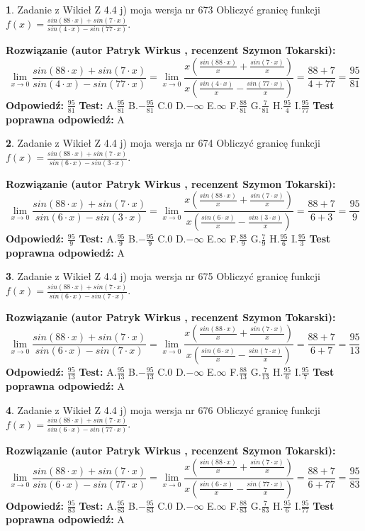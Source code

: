 \documentclass[12pt, a4paper]{article}
\theoremstyle{definition} %
\newtheorem{zad}{}
\newcommand{\zadStart}[1]{\begin{zad}#1\newline}
\newcommand{\zadStop}{\end{zad}}
\newcommand{\rozwStart}[2]{\noindent \textbf{Rozwiązanie (autor #1 , recenzent #2): }\newline}
\newcommand{\rozwStop}{\newline}
\newcommand{\odpStart}{\noindent \textbf{Odpowiedź:}\newline}
\newcommand{\odpStop}{\newline}
\newcommand{\testStart}{\noindent \textbf{Test:}\newline}
\newcommand{\testStop}{\newline}
\newcommand{\kluczStart}{\noindent \textbf{Test poprawna odpowiedź:}\newline}
\newcommand{\kluczStop}{\newline}
\begin{document}
\zadStart{Zadanie z Wikieł Z 4.4 j) moja wersja nr 673}
Obliczyć granicę funkcji $f(x)=\frac{sin(88\cdot x) +sin(7\cdot x)}{sin(4\cdot x) -sin(77\cdot x)}$.
\zadStop
\rozwStart{Patryk Wirkus}{Szymon Tokarski}
$$\lim\limits_{x\to 0}\frac{sin(88\cdot x) +sin(7\cdot x)}{sin(4\cdot x) -sin(77\cdot x)}=\lim\limits_{x\to 0}\frac{x(\frac{sin(88\cdot x)}{x}+\frac{sin(7\cdot x)}{x})}{x(\frac{sin(4\cdot x)}{x}-\frac{sin(77\cdot x)}{x})}=\frac{88+7}{4+77} = \frac{95}{81}$$
\rozwStop
\odpStart
$\frac{95}{81}$
\odpStop
\testStart
A.$\frac{95}{81}$
B.$-\frac{95}{81}$
C.$0$
D.$-\infty$
E.$\infty$
F.$\frac{88}{81}$
G.$\frac{7}{81}$
H.$\frac{95}{4}$
I.$\frac{95}{77}$
\testStop
\kluczStart
A
\kluczStop



\zadStart{Zadanie z Wikieł Z 4.4 j) moja wersja nr 674}
Obliczyć granicę funkcji $f(x)=\frac{sin(88\cdot x) +sin(7\cdot x)}{sin(6\cdot x) -sin(3\cdot x)}$.
\zadStop
\rozwStart{Patryk Wirkus}{Szymon Tokarski}
$$\lim\limits_{x\to 0}\frac{sin(88\cdot x) +sin(7\cdot x)}{sin(6\cdot x) -sin(3\cdot x)}=\lim\limits_{x\to 0}\frac{x(\frac{sin(88\cdot x)}{x}+\frac{sin(7\cdot x)}{x})}{x(\frac{sin(6\cdot x)}{x}-\frac{sin(3\cdot x)}{x})}=\frac{88+7}{6+3} = \frac{95}{9}$$
\rozwStop
\odpStart
$\frac{95}{9}$
\odpStop
\testStart
A.$\frac{95}{9}$
B.$-\frac{95}{9}$
C.$0$
D.$-\infty$
E.$\infty$
F.$\frac{88}{9}$
G.$\frac{7}{9}$
H.$\frac{95}{6}$
I.$\frac{95}{3}$
\testStop
\kluczStart
A
\kluczStop



\zadStart{Zadanie z Wikieł Z 4.4 j) moja wersja nr 675}
Obliczyć granicę funkcji $f(x)=\frac{sin(88\cdot x) +sin(7\cdot x)}{sin(6\cdot x) -sin(7\cdot x)}$.
\zadStop
\rozwStart{Patryk Wirkus}{Szymon Tokarski}
$$\lim\limits_{x\to 0}\frac{sin(88\cdot x) +sin(7\cdot x)}{sin(6\cdot x) -sin(7\cdot x)}=\lim\limits_{x\to 0}\frac{x(\frac{sin(88\cdot x)}{x}+\frac{sin(7\cdot x)}{x})}{x(\frac{sin(6\cdot x)}{x}-\frac{sin(7\cdot x)}{x})}=\frac{88+7}{6+7} = \frac{95}{13}$$
\rozwStop
\odpStart
$\frac{95}{13}$
\odpStop
\testStart
A.$\frac{95}{13}$
B.$-\frac{95}{13}$
C.$0$
D.$-\infty$
E.$\infty$
F.$\frac{88}{13}$
G.$\frac{7}{13}$
H.$\frac{95}{6}$
I.$\frac{95}{7}$
\testStop
\kluczStart
A
\kluczStop



\zadStart{Zadanie z Wikieł Z 4.4 j) moja wersja nr 676}
Obliczyć granicę funkcji $f(x)=\frac{sin(88\cdot x) +sin(7\cdot x)}{sin(6\cdot x) -sin(77\cdot x)}$.
\zadStop
\rozwStart{Patryk Wirkus}{Szymon Tokarski}
$$\lim\limits_{x\to 0}\frac{sin(88\cdot x) +sin(7\cdot x)}{sin(6\cdot x) -sin(77\cdot x)}=\lim\limits_{x\to 0}\frac{x(\frac{sin(88\cdot x)}{x}+\frac{sin(7\cdot x)}{x})}{x(\frac{sin(6\cdot x)}{x}-\frac{sin(77\cdot x)}{x})}=\frac{88+7}{6+77} = \frac{95}{83}$$
\rozwStop
\odpStart
$\frac{95}{83}$
\odpStop
\testStart
A.$\frac{95}{83}$
B.$-\frac{95}{83}$
C.$0$
D.$-\infty$
E.$\infty$
F.$\frac{88}{83}$
G.$\frac{7}{83}$
H.$\frac{95}{6}$
I.$\frac{95}{77}$
\testStop
\kluczStart
A
\kluczStop
\end{document}
